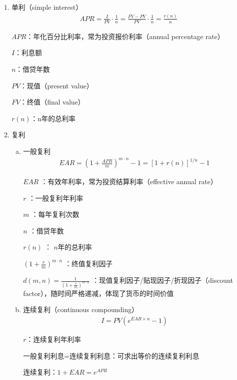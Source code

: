 \documentclass[12pt]{book}
\begin{document}
\begin{enumerate}[(1)]
    \item 单利（simple interest）
          \begin{gather*}
              APR=\frac{I}{PV}·\frac{1}{n} =\frac{FV-PV}{PV}·\frac{1}{n}=\frac{r(n)}{n}
          \end{gather*}
          \par $APR$：年化百分比利率，常为投资报价利率（annual percentage rate）
          \par $I$：利息额
          \par $n$：借贷年数
          \par $PV$：现值（present value）
          \par $FV$：终值（final value）
          \par $r(n)$：n年的总利率
    \item 复利
          \begin{enumerate}[a.]
              \item 一般复利
                    \begin{gather*}
                        EAR=\left(1+\frac{APR}{m}\right)^{m\cdot n}-1=\left[1+r\left(n\right)\right]^{1/n}-1
                    \end{gather*}
                    \par $EAR$ ：有效年利率，常为投资结算利率（effective annual rate）
                    \par $r$ ：一般复利年利率
                    \par $m$ ：每年复利次数
                    \par $n$ ：借贷年数
                    \par $r(n)$ ： $n$年的总利率
                    \par $\left(1+\frac{r}{m}\right)^{m·n}$ ：终值复利因子
                    \par $d(m,n)=\frac{1}{\left(1+\frac{r}{m}\right)^{m·n}}$ ：现值复利因子/贴现因子/折现因子（discount factor），随时间严格递减，体现了货币的时间价值
              \item 连续复利（continuous compounding）
                    \begin{gather*}
                        I=PV(e^{EAR\times n}-1)
                    \end{gather*}
                    \par $r$：连续复利年利率
                    \par 一般复利利息=连续复利利息：可求出等价的连续复利利息
                    \par 连续复利：$1+EAR=e^{APR}$
          \end{enumerate}
\end{enumerate}
\end{document}
